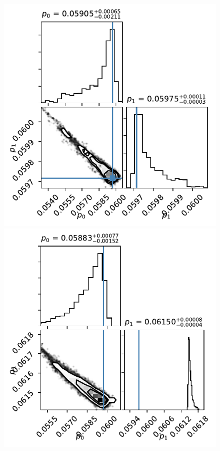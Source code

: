 \begin{figure}%
    \centering
    \includegraphics[scale=0.75]{robin/corner_quad_spotless_2.pdf}
    \includegraphics[scale=0.75]{robin/corner_quad_2.pdf}

\end{figure}
